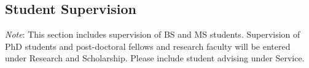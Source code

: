 \documentclass[11pt]{article}
\begin{document}

\subsection{Student Supervision}
\emph{Note}: This section includes supervision of BS and MS students.  Supervision of PhD students and post-doctoral fellows and research faculty will be entered under Research and Scholarship.   Please include student advising under Service.
\end{document}
